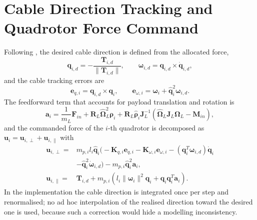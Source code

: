 \documentclass[Review,sageh,times]{sagej}
\begin{document}
\section*{Cable Direction Tracking and Quadrotor Force Command}

Following \citet{lee2013a}, the desired cable direction is defined from the
allocated force,
\begin{equation}
\mathbf{q}_{i,d} = -\frac{\mathbf{T}_{i,d}}{\|\mathbf{T}_{i,d}\|},
\qquad
\boldsymbol{\omega}_{i,d} = \mathbf{q}_{i,d}\times\dot{\mathbf{q}}_{i,d},
\label{eq:qd}
\end{equation}
and the cable tracking errors are
\begin{equation}
\mathbf{e}_{q,i} = \mathbf{q}_{i,d}\times\mathbf{q}_i,
\qquad
\mathbf{e}_{\omega,i} = \boldsymbol{\omega}_i + \hat{\mathbf{q}}_i^{2}\boldsymbol{\omega}_{i,d}.
\label{eq:eqew}
\end{equation}
The feedforward term that accounts for payload translation and rotation is
\begin{equation}
\mathbf{a}_i = \frac{1}{m_L}\mathbf{F}_{in}
+ \mathbf{R}_L\hat{\boldsymbol{\Omega}}_L^{2}\boldsymbol{\rho}_i
+ \mathbf{R}_L\hat{\boldsymbol{\rho}}_i\mathbf{J}_L^{-1}
\left(\hat{\boldsymbol{\Omega}}_L\mathbf{J}_L\boldsymbol{\Omega}_L - \mathbf{M}_{in}\right),
\label{eq:ai}
\end{equation}
and the commanded force of the $i$-th quadrotor is decomposed as
$\mathbf{u}_i=\mathbf{u}_{i,\perp}+\mathbf{u}_{i,\parallel}$ with
\begin{equation}
\begin{split}
\mathbf{u}_{i,\perp} = {}& m_{p,i}l_i\hat{\mathbf{q}}_i
\Big(-\mathbf{K}_{q,i}\mathbf{e}_{q,i} - \mathbf{K}_{\omega,i}\mathbf{e}_{\omega,i}
- \left(\mathbf{q}_i^{T}\boldsymbol{\omega}_{i,d}\right)\dot{\mathbf{q}}_i\\
&- \hat{\mathbf{q}}_i^{2}\dot{\boldsymbol{\omega}}_{i,d}\Big)
- m_{p,i}\hat{\mathbf{q}}_i^{2}\mathbf{a}_i,\\
\mathbf{u}_{i,\parallel} = {}& \mathbf{T}_{i,d}
+ m_{p,i}\left(l_i\|\boldsymbol{\omega}_i\|^2\mathbf{q}_i
+ \mathbf{q}_i\mathbf{q}_i^{T}\mathbf{a}_i\right).
\end{split}
\label{eq:uiperp}
\end{equation}
In the implementation the cable direction is integrated once per step and
renormalised; no ad hoc interpolation of the realised direction toward the
desired one is used, because such a correction would hide a modelling
inconsistency.
\end{document}
